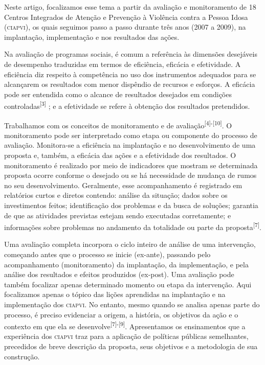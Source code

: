 \documentclass{article}
\begin{document}
Neste artigo, focalizamos esse tema a partir da avaliação e monitoramento de 18
Centros Integrados de Atenção e Prevenção à Violência contra a Pessoa Idosa
(\textsc{ciapvi}), os quais seguimos passo a passo durante três anos (2007 a 2009), na
implantação, implementação e nos resultados das ações.

Na avaliação de programas sociais, é comum a referência às dimensões desejáveis
de desempenho traduzidas em termos de eficiência, eficácia e efetividade. A
eficiência diz respeito à competência no uso dos instrumentos adequados para se
alcançarem os resultados com menor dispêndio de recursos e esforços. A eficácia
pode ser entendida como o alcance de resultados desejados em condições
controladas\textsuperscript{[}\textsuperscript{3}\textsuperscript{]}
; e a efetividade se refere à obtenção dos resultados pretendidos.

Trabalhamos com os conceitos de monitoramento e de
avaliação\textsuperscript{[}\textsuperscript{4}\textsuperscript{]}\textsuperscript{-}\textsuperscript{[}\textsuperscript{10}\textsuperscript{]}. O monitoramento pode ser interpretado como etapa ou componente do processo de
avaliação. Monitora-se a eficiência na implantação e no desenvolvimento de uma
proposta e, também, a eficácia das ações e a efetividade dos resultados. O
monitoramento é realizado por meio de indicadores que mostram se determinada
proposta ocorre conforme o desejado ou se há necessidade de mudança de rumos no
seu desenvolvimento. Geralmente, esse acompanhamento é registrado em relatórios
curtos e diretos contendo: análise da situação; dados sobre os investimentos
feitos; identificação dos problemas e da busca de soluções; garantia de que as
atividades previstas estejam sendo executadas corretamente; e informações sobre
problemas no andamento da totalidade ou parte da
proposta\textsuperscript{[}\textsuperscript{7}\textsuperscript{]}.

Uma avaliação completa incorpora o ciclo inteiro de análise de uma intervenção,
começando antes que o processo se inicie (ex-ante), passando pelo acompanhamento
(monitoramento) da implantação, da implementação, e pela análise dos resultados
e efeitos produzidos (ex-post). Uma avaliação pode também focalizar apenas
determinado momento ou etapa da intervenção. Aqui focalizamos apenas o tópico
das lições aprendidas na implantação e na implementação dos \textsc{ciapvi}. No entanto,
mesmo quando se analisa apenas parte do processo, é preciso evidenciar a origem,
a história, os objetivos da ação e o contexto em que ela se
desenvolve\textsuperscript{[}\textsuperscript{7}\textsuperscript{]}\textsuperscript{-}\textsuperscript{[}\textsuperscript{9}\textsuperscript{]}. Apresentamos os ensinamentos que a experiência dos \textsc{ciapvi} traz para a
aplicação de políticas públicas semelhantes, precedidos de breve descrição da
proposta, seus objetivos e a metodologia de sua construção.
\end{document}
